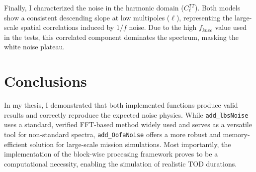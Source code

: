 \documentclass{article}
\begin{document}
Finally, I characterized the noise in the harmonic domain ($C_\ell^{TT}$). Both models show a consistent descending slope at low multipoles ($\ell$), representing the large-scale spatial correlations induced by $1/f$ noise. Due to the high $f_{knee}$ value used in the tests, this correlated component dominates the spectrum, masking the white noise plateau.



\section*{Conclusions} 
In my thesis, I demonstrated that both implemented functions produce valid results and correctly reproduce the expected noise physics. While \texttt{add\_lbsNoise} uses a standard, verified FFT-based method widely used and serves as a versatile tool for non-standard spectra, \texttt{add\_OofaNoise} offers a more robust and memory-efficient solution for large-scale mission simulations. Most importantly, the implementation of the block-wise processing framework proves to be a computational necessity, enabling the simulation of realistic TOD durations.
\end{document}
